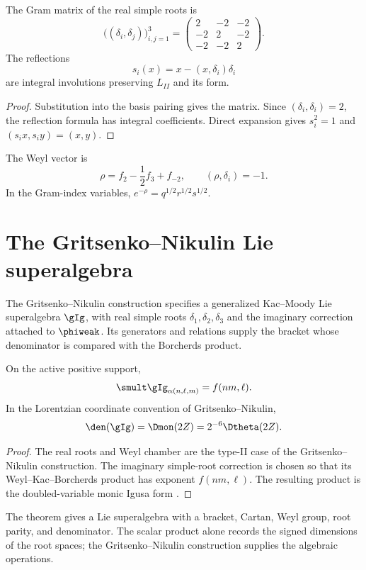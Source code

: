 \begin{proposition}
The Gram matrix of the real simple roots is
\[
 \bigl((\delta_i,\delta_j)\bigr)_{i,j=1}^3
 =\begin{pmatrix}
 2&-2&-2\\
 -2&2&-2\\
 -2&-2&2
 \end{pmatrix}.
\]
The reflections
\[
 s_i(x)=x-(x,\delta_i)\delta_i
\]
are integral involutions preserving $L_{II}$ and its form.
\end{proposition}
\begin{proof}
Substitution into the basis pairing gives the matrix. Since $(\delta_i,\delta_i)=2$, the reflection formula has integral coefficients. Direct expansion gives $s_i^2=1$ and $(s_ix,s_iy)=(x,y)$.
\end{proof}

The Weyl vector is
\[
 \rho=f_2-\frac12f_3+f_{-2},
 \qquad (\rho,\delta_i)=-1.
\]
In the Gram-index variables, $e^{-\rho}=q^{1/2}r^{1/2}s^{1/2}$.

\chapter[The denominator algebra]{The Gritsenko--Nikulin Lie superalgebra}
The Gritsenko--Nikulin construction specifies a generalized
Kac--Moody Lie superalgebra \(\gIg\), with real simple roots
\(\delta_1,\delta_2,\delta_3\) and the imaginary correction
attached to \(\phiweak\). Its generators and relations supply the
bracket whose denominator is compared with the Borcherds product.

\begin{theorem}
On the active positive support,
\[
 \smult\gIg_{\alpha(n,\ell,m)}=f(nm,\ell).
\]
In the Lorentzian coordinate convention of Gritsenko--Nikulin,
\[
 \den(\gIg)=\Dmon(2Z)=2^{-6}\Dtheta(2Z).
\]
\end{theorem}
\begin{proof}
The real roots and Weyl chamber are the type-II case of the Gritsenko--Nikulin construction. The imaginary simple-root correction is chosen so that its Weyl--Kac--Borcherds product has exponent $f(nm,\ell)$. The resulting product is the doubled-variable monic Igusa form \cite{GN97,GN98a,GN98b}.
\end{proof}

The theorem gives a Lie superalgebra with a bracket, Cartan, Weyl group, root parity, and denominator. The scalar product alone records the signed dimensions of the root spaces; the Gritsenko--Nikulin construction supplies the algebraic operations.

